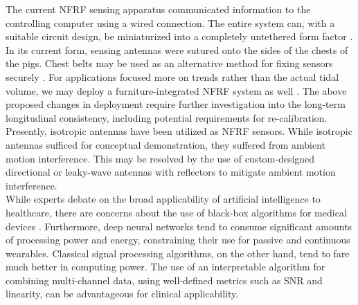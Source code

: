 \documentclass[journal]{IEEEtran}
\begin{document}
The current NFRF sensing apparatus communicated information to the controlling computer using a wired connection. The entire system can, with a suitable circuit design, be miniaturized into a completely untethered form factor \cite{zhouRadioFrequencyNearFieldSensor2023}. In its current form, sensing antennas were sutured onto the sides of the chests of the pigs. Chest belts may be used as an alternative method for fixing sensors securely \cite{sharmaWearableRadiofrequencySensing2020}. For applications focused more on trends rather than the actual tidal volume, we may deploy a furniture-integrated NFRF system as well \cite{zhangFurnitureIntegratedRespirationSensors2021}.  The above proposed changes in deployment require further investigation into the long-term longitudinal consistency, including potential requirements for re-calibration. Presently, isotropic antennas have been utilized as NFRF sensors. While isotropic antennas sufficed for conceptual demonstration, they suffered from ambient motion interference. This may be resolved by the use of custom-designed directional or leaky-wave antennas with reflectors to mitigate ambient motion interference. \\
While experts debate on the broad applicability of artificial intelligence to healthcare, there are concerns about the use of black-box algorithms for medical devices \cite{amannExplainabilityArtificialIntelligence2020}. Furthermore, deep neural networks tend to consume significant amounts of processing power and energy, constraining their use for passive and continuous wearables. Classical signal processing algorithms, on the other hand, tend to fare much better in computing power. The use of an interpretable algorithm for combining multi-channel data, using well-defined metrics such as SNR and linearity, can be advantageous for clinical applicability.
\end{document}
